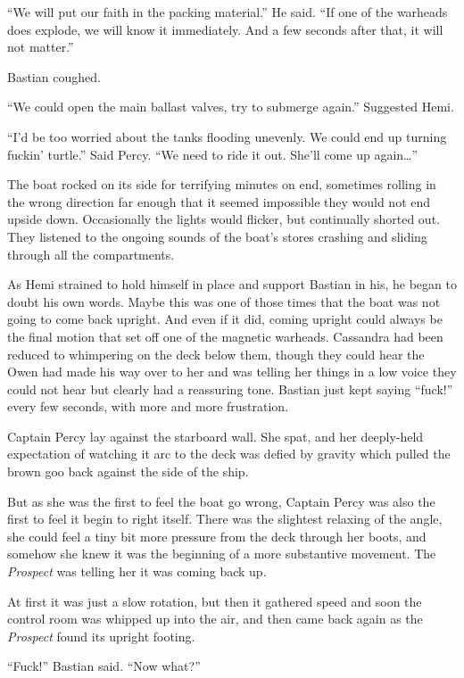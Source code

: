 \documentclass[
]{scrbook}
\begin{document}
``We will put our faith in the packing material.'' He said. ``If one of
the warheads does explode, we will know it immediately. And a few
seconds after that, it will not matter.''

Bastian coughed.

``We could open the main ballast valves, try to submerge again.''
Suggested Hemi.

``I'd be too worried about the tanks flooding unevenly. We could end up
turning fuckin' turtle.'' Said Percy. ``We need to ride it out. She'll
come up again\ldots{}''

The boat rocked on its side for terrifying minutes on end, sometimes
rolling in the wrong direction far enough that it seemed impossible they
would not end upside down. Occasionally the lights would flicker, but
continually shorted out. They listened to the ongoing sounds of the
boat's stores crashing and sliding through all the compartments.

As Hemi strained to hold himself in place and support Bastian in his, he
began to doubt his own words. Maybe this was one of those times that the
boat was not going to come back upright. And even if it did, coming
upright could always be the final motion that set off one of the
magnetic warheads. Cassandra had been reduced to whimpering on the deck
below them, though they could hear the Owen had made his way over to her
and was telling her things in a low voice they could not hear but
clearly had a reassuring tone. Bastian just kept saying ``fuck!'' every
few seconds, with more and more frustration.

Captain Percy lay against the starboard wall. She spat, and her
deeply-held expectation of watching it arc to the deck was defied by
gravity which pulled the brown goo back against the side of the ship.

But as she was the first to feel the boat go wrong, Captain Percy was
also the first to feel it begin to right itself. There was the slightest
relaxing of the angle, she could feel a tiny bit more pressure from the
deck through her boots, and somehow she knew it was the beginning of a
more substantive movement. The \emph{Prospect} was telling her it was
coming back up.

At first it was just a slow rotation, but then it gathered speed and
soon the control room was whipped up into the air, and then came back
again as the \emph{Prospect} found its upright footing.

``Fuck!'' Bastian said. ``Now what?''
\end{document}
